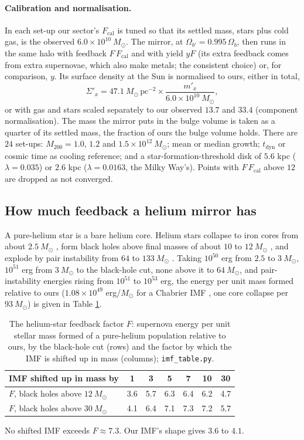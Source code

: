\documentclass[11pt]{article}
\theoremstyle{definition}
\newcommand{\Msun}{M_{\odot}}
\newcommand{\file}[1]{\texttt{#1}}
\begin{document}
\paragraph{Calibration and normalisation.} In each set-up our sector's $F_{\mathrm{cal}}$ is tuned so that its settled mass, stars plus cold gas, is the observed $6.0 \times 10^{10}\ \Msun$. The mirror, at $\Omega_{b'} = 0.995\,\Omega_{b}$, then runs in the same halo with feedback $F\,F_{\mathrm{cal}}$ and with yield $yF$ (its extra feedback comes from extra supernovae, which also make metals; the consistent choice) or, for comparison, $y$. Its surface density at the Sun is normalised to ours, either in total,
\[
\Sigma'_{x} = 47.1\ \Msun\,\mathrm{pc^{-2}}\times\frac{m'_{x}}{6.0 \times 10^{10}\ \Msun},
\]
or with gas and stars scaled separately to our observed $13.7$ and $33.4$ (component normalisation). The mass the mirror puts in the bulge volume is taken as a quarter of its settled mass, the fraction of ours the bulge volume holds. There are $24$ set-ups: $M_{200} = 1.0$, $1.2$ and $1.5 \times 10^{12}\ \Msun$; mean or median growth; $t_{\mathrm{dyn}}$ or cosmic time as cooling reference; and a star-formation-threshold disk of $5.6$ kpc ($\lambda = 0.035$) or $2.6$ kpc ($\lambda = 0.0163$, the Milky Way's). Points with $F\,F_{\mathrm{cal}}$ above $12$ are dropped as not converged.

\subsection{How much feedback a helium mirror has}

A pure-helium star is a bare helium core. Helium stars collapse to iron cores from about $2.5\ \Msun$ \cite{Woosley2019}, form black holes above final masses of about $10$ to $12\ \Msun$ \cite{Woosley2019, Ertl2020}, and explode by pair instability from $64$ to $133\ \Msun$ \cite{HegerWoosley2002}. Taking $10^{50}$ erg from $2.5$ to $3\ \Msun$, $10^{51}$ erg from $3\ \Msun$ to the black-hole cut, none above it to $64\ \Msun$, and pair-instability energies rising from $10^{51}$ to $10^{53}$ erg, the energy per unit mass formed relative to ours ($1.08 \times 10^{49}$ erg/$\Msun$ for a Chabrier IMF \cite{Chabrier2003}, one core collapse per $93\ \Msun$) is given in Table \ref{tab:F}.
\begin{table}[htbp]\centering\small
\begin{tabular}{@{}lcccccc@{}}
\toprule
IMF shifted up in mass by & 1 & 3 & 5 & 7 & 10 & 30\\
\midrule
$F$, black holes above $12\ \Msun$ & 3.6 & 5.7 & 6.3 & 6.4 & 6.2 & 4.7\\
$F$, black holes above $30\ \Msun$ & 4.1 & 6.4 & 7.1 & 7.3 & 7.2 & 5.7\\
\bottomrule
\end{tabular}
\caption{The helium-star feedback factor $F$: supernova energy per unit stellar mass formed of a pure-helium population relative to ours, by the black-hole cut (rows) and the factor by which the IMF is shifted up in mass (columns); \file{imf\_table.py}.}
\label{tab:F}
\end{table}
No shifted IMF exceeds $F \approx 7.3$. Our IMF's shape gives $3.6$ to $4.1$.
\end{document}
